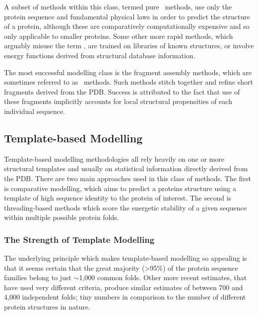 A subset of methods within this class, termed pure \abinitio\ methods, use
only the protein sequence and fundamental physical laws in order to predict the structure
of a protein, although these are comparatively computationally expensive and
so only applicable to smaller proteins\cite{COMPCHEM:Gib2001}. Some other more rapid methods, which arguably misuse the term \abinitio, are 
trained on libraries of known structures\cite{NATIVE:Sippl1992}, or involve energy functions derived from structural database information\cite{NATIVE:Sippl1996}.

The most successful modelling class is the fragment assembly methods, which are
sometimes referred to as \denovo\ methods. Such methods
stitch together and refine short fragments derived from the PDB\cite{METHOD:Rosetta}. Success is attributed to the fact that use of these fragments
implicitly accounts for  local structural propensities of each individual sequence.










\subsection{Template-based Modelling}

Template-based modelling methodologies all rely heavily on one or more
structural templates and usually on statistical information directly
derived from the PDB. There are two main approaches used in this class of methods. The first is
comparative modelling, which aims to predict a proteins structure using a
template of high sequence identity to the protein of interest. The
second is threading-based methods which score the energetic stability
of a given sequence within multiple possible protein folds. 

\subsubsection{The Strength of Template Modelling}



The underlying principle which makes template-based modelling so appealing is
that it seems certain that the great majority (\textgreater95\%) of the protein sequence families belong to just $\sim$1,000 common folds\cite{SEQUENCE:Zuck75}.
Other more recent estimates, that have used very different criteria, produce similar estimates of between
700 and 4,000 independent folds\cite{NATIVE:Govindarajan1999,NATIVE:Wolf2000,NATIVE:Zhang1998}; tiny numbers in comparison to the number of
different protein structures in nature. 

